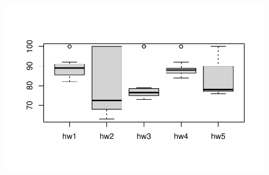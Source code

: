 \documentclass[
  letterpaper,
  DIV=11,
  numbers=noendperiod]{scrartcl}
\begin{document}
\begin{figure}[H]

{\centering \includegraphics{class6wksheet_files/figure-pdf/unnamed-chunk-21-1.pdf}

}

\end{figure}
\end{document}
